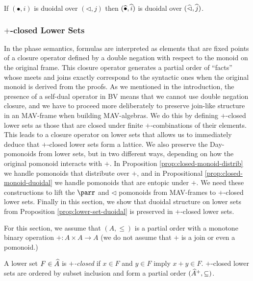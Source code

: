 \begin{proposition}\label{prop:lower-set-duoidal}
  If $(\bullet, i)$ is duoidal over $(\lhd, j)$ then
  $(\mathop{\widehat{\bullet}}, \mathop{\widehat{i}})$ is duoidal over $(\mathop{\widehat{\lhd}}, \mathop{\widehat{j}})$.
\end{proposition}

\subsubsection{$+$-closed Lower Sets}
\label{sec:closed-lower-sets}

In the phase semantics, formulas are interpreted as elements that are
fixed points of a closure operator defined by a double negation with
respect to the monoid on the original frame. This closure operator
generates a partial order of ``facts'' whose meets and joins exactly
correspond to the syntactic ones when the original monoid is derived
from the proofs. As we mentioned in the introduction, the presence of
a self-dual operator in BV means that we cannot use double negation
closure, and we have to proceed more deliberately to preserve
join-like structure in an MAV-frame when building MAV-algebras. We do
this by defining $+$-closed lower sets as those that are closed under
finite $+$-combinations of their elements. This leads to a closure
operator on lower sets that allows us to immediately deduce that
$+$-closed lower sets form a lattice. We also preserve the
Day-pomonoids from lower sets, but in two different ways, depending on
how the original pomonoid interacts with $+$. In Proposition
\ref{prop:closed-monoid-distrib} we handle pomonoids that distribute
over $+$, and in Propositional \ref{prop:closed-monoid-duoidal} we
handle pomonoids that are entopic under $+$. We need these
constructions to lift the $\parr$ and $\lhd$ pomonoids from
MAV-frames to $+$-closed lower sets. Finally in this section, we show
that duoidal structure on lower sets from Proposition
\ref{prop:lower-set-duoidal} is preserved in $+$-closed lower sets.

For this section, we assume that $(A, \leq)$ is a partial order with a
monotone binary operation $+ : A \times A \to A$ (we do not assume
that $+$ is a join or even a pomonoid.)

\begin{definition}
  A lower set $F \in \widehat{A}$ is \emph{$+$-closed} if $x \in F$
  and $y \in F$ imply $x + y \in F$. $+$-closed lower sets are ordered
  by subset inclusion and form a partial order
  $(\widehat{A}^+, \subseteq)$.
\end{definition}


